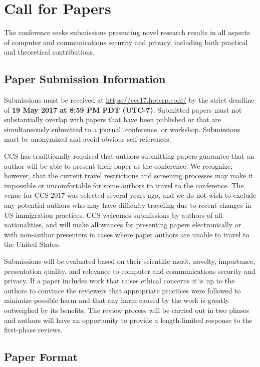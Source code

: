 \section{Call for Papers}

The conference seeks submissions presenting novel research results in
all aspects of computer and communications security and privacy,
including both practical and theoretical contributions.

\subsection{Paper Submission Information}

Submissions must be received at \url{https://ccs17.hotcrp.com/} by the
strict deadline of {\bf 19 May 2017 at 8:59 PM PDT (UTC-7)}.
Submitted papers must not substantially overlap with papers that have
been published or that are simultaneously submitted to a journal,
conference, or workshop. Submissions must be anonymized and avoid
obvious self-references.

CCS has traditionally required that authors submitting papers
guarantee that an author will be able to present their paper at the
conference. We recognize, however, that the current travel
restrictions and screening processes may make it impossible or
uncomfortable for some authors to travel to the conference. The venue
for CCS 2017 was selected several years ago, and we do not wish to
exclude any potential authors who may have difficulty traveling due to
recent changes in US immigration practices.  CCS welcomes submissions
by authors of all nationalities, and will make allowances for
presenting papers electronically or with non-author presenters in
cases where paper authors are unable to travel to the United States.

Submissions will be evaluated based on their scientific merit,
novelty, importance, presentation quality, and relevance to computer
and communications security and privacy.  If a paper includes work
that raises ethical concerns it is up to the authors to convince the
reviewers that appropriate practices were followed to minimize
possible harm and that any harm caused by the work is greatly
outweighed by its benefits. The review process will be carried out in
two phases and authors will have an opportunity to provide a
length-limited response to the first-phase reviews.

\subsection{Paper Format}

